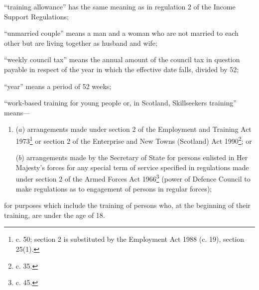 \documentclass[12pt,a4paper]{article}
\begin{document}
\begin{enumerate}
“training allowance” has the same meaning as in regulation 2 of the Income Support Regulations;

“unmarried couple” means a man and a woman who are not married to each other but are living together as husband and wife;

“weekly council tax” means the annual amount of the council tax in question payable in respect of the year in which the effective date falls, divided by 52;

“year” means a period of 52 weeks;

“work-based training for young people or, in Scotland, Skillseekers training”  %
means—
\begin{enumerate}\item[]
($a$)
arrangements made under section 2 of the Employment and Training Act 1973\footnote{ c. 50; section 2 is substituted by the Employment Act 1988 (c. 19), section 25(1).} or section 2 of the Enterprise and New Towns (Scotland) Act 1990\footnote{ c. 35.}; or

($b$)
arrangements made by the Secretary of State for persons enlisted in Her Majesty’s forces for any special term of service specified in regulations made under section 2 of the Armed Forces Act 1966\footnote{ c. 45.} (power of Defence Council to make regulations as to engagement of persons in regular forces);
\end{enumerate}

for purposes which include the training of persons who, at the beginning of their training, are under the age of 18.
\end{enumerate}
\end{document}
